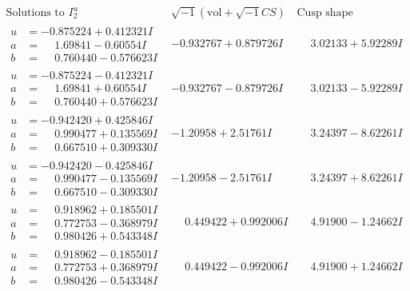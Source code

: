 \documentclass[1p]{elsarticle_modified}
\theoremstyle{definition}
\newcommand{\I}{\sqrt{-1}}
\begin{document}
$$\begin{array}{c|c|c}  
\text{Solutions to }I^u_{2}& \I (\text{vol} + \sqrt{-1}CS) & \text{Cusp shape}\\
 \hline 
\begin{aligned}
u &= -0.875224 + 0.412321 I \\
a &= \phantom{-}1.69841 - 0.60554 I \\
b &= \phantom{-}0.760440 - 0.576623 I\end{aligned}
 & -0.932767 + 0.879726 I & \phantom{-}3.02133 + 5.92289 I \\ \hline\begin{aligned}
u &= -0.875224 - 0.412321 I \\
a &= \phantom{-}1.69841 + 0.60554 I \\
b &= \phantom{-}0.760440 + 0.576623 I\end{aligned}
 & -0.932767 - 0.879726 I & \phantom{-}3.02133 - 5.92289 I \\ \hline\begin{aligned}
u &= -0.942420 + 0.425846 I \\
a &= \phantom{-}0.990477 + 0.135569 I \\
b &= \phantom{-}0.667510 + 0.309330 I\end{aligned}
 & -1.20958 + 2.51761 I & \phantom{-}3.24397 - 8.62261 I \\ \hline\begin{aligned}
u &= -0.942420 - 0.425846 I \\
a &= \phantom{-}0.990477 - 0.135569 I \\
b &= \phantom{-}0.667510 - 0.309330 I\end{aligned}
 & -1.20958 - 2.51761 I & \phantom{-}3.24397 + 8.62261 I \\ \hline\begin{aligned}
u &= \phantom{-}0.918962 + 0.185501 I \\
a &= \phantom{-}0.772753 - 0.368979 I \\
b &= \phantom{-}0.980426 + 0.543348 I\end{aligned}
 & \phantom{-}0.449422 + 0.992006 I & \phantom{-}4.91900 - 1.24662 I \\ \hline\begin{aligned}
u &= \phantom{-}0.918962 - 0.185501 I \\
a &= \phantom{-}0.772753 + 0.368979 I \\
b &= \phantom{-}0.980426 - 0.543348 I\end{aligned}
 & \phantom{-}0.449422 - 0.992006 I & \phantom{-}4.91900 + 1.24662 I \\ \hline\begin{aligned}

\end{aligned}
\end{array}$$
\end{document}
